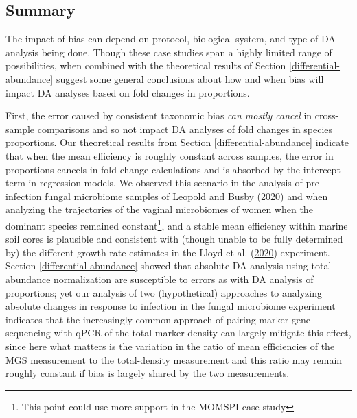 \documentclass[
]{article}
\begin{document}
\hypertarget{summary-1}{%
\subsection{Summary}\label{summary-1}}

The impact of bias can depend on protocol, biological system, and type of DA analysis being done.
Though these case studies span a highly limited range of possibilities, when combined with the theoretical results of Section \ref{differential-abundance} suggest some general conclusions about how and when bias will impact DA analyses based on fold changes in proportions.

First, the error caused by consistent taxonomic bias \emph{can mostly cancel} in cross-sample comparisons and so not impact DA analyses of fold changes in species proportions.
Our theoretical results from Section \ref{differential-abundance} indicate that when the mean efficiency is roughly constant across samples, the error in proportions cancels in fold change calculations and is absorbed by the intercept term in regression models.
We observed this scenario in the analysis of pre-infection fungal microbiome samples of Leopold and Busby (\protect\hyperlink{ref-leopold2020host}{2020}) and when analyzing the trajectories of the vaginal microbiomes of women when the dominant species remained constant\footnote{This point could use more support in the MOMSPI case study}, and a stable mean efficiency within marine soil cores is plausible and consistent with (though unable to be fully determined by) the different growth rate estimates in the Lloyd et al. (\protect\hyperlink{ref-lloyd2020evid}{2020}) experiment.
Section \ref{differential-abundance} showed that absolute DA analysis using total-abundance normalization are susceptible to errors as with DA analysis of proportions; yet our analysis of two (hypothetical) approaches to analyzing absolute changes in response to infection in the fungal microbiome experiment indicates that the increasingly common approach of pairing marker-gene sequencing with qPCR of the total marker density can largely mitigate this effect, since here what matters is the variation in the ratio of mean efficiencies of the MGS measurement to the total-density measurement and this ratio may remain roughly constant if bias is largely shared by the two measurements.
\end{document}
